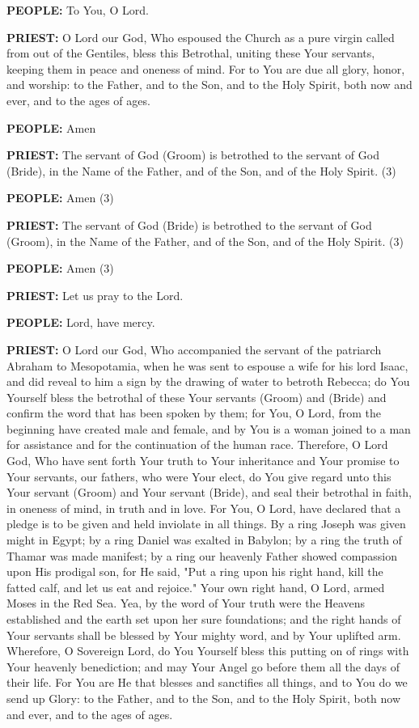\textbf{PEOPLE:} To You, O Lord.

\textbf{PRIEST:} O Lord our God, Who espoused the Church as a pure
virgin called from out of the Gentiles, bless this Betrothal, uniting
these Your servants, keeping them in peace and oneness of mind. For to
You are due all glory, honor, and worship: to the Father, and to the
Son, and to the Holy Spirit, both now and ever, and to the ages of ages.

\textbf{PEOPLE:} Amen

\textbf{PRIEST:} The servant of God (Groom) is betrothed to the servant
of God (Bride), in the Name of the Father, and of the Son, and of the
Holy Spirit. (3)

\textbf{PEOPLE:} Amen (3)

\textbf{PRIEST:} The servant of God (Bride) is betrothed to the servant
of God (Groom), in the Name of the Father, and of the Son, and of the
Holy Spirit. (3)

\textbf{PEOPLE:} Amen (3)

\textbf{PRIEST:} Let us pray to the Lord.

\textbf{PEOPLE:} Lord, have mercy.

\textbf{PRIEST:} O Lord our God, Who accompanied the servant of the
patriarch Abraham to Mesopotamia, when he was sent to espouse a wife for
his lord Isaac, and did reveal to him a sign by the drawing of water to
betroth Rebecca; do You Yourself bless the betrothal of these Your
servants (Groom) and (Bride) and confirm the word that has been spoken
by them; for You, O Lord, from the beginning have created male and
female, and by You is a woman joined to a man for assistance and for the
continuation of the human race. Therefore, O Lord God, Who have sent
forth Your truth to Your inheritance and Your promise to Your servants,
our fathers, who were Your elect, do You give regard unto this Your
servant (Groom) and Your servant (Bride), and seal their betrothal in
faith, in oneness of mind, in truth and in love. For You, O Lord, have
declared that a pledge is to be given and held inviolate in all things.
By a ring Joseph was given might in Egypt; by a ring Daniel was exalted
in Babylon; by a ring the truth of Thamar was made manifest; by a ring
our heavenly Father showed compassion upon His prodigal son, for He
said, "Put a ring upon his right hand, kill the fatted calf, and let us
eat and rejoice." Your own right hand, O Lord, armed Moses in the Red
Sea. Yea, by the word of Your truth were the Heavens established and the
earth set upon her sure foundations; and the right hands of Your
servants shall be blessed by Your mighty word, and by Your uplifted arm.
Wherefore, O Sovereign Lord, do You Yourself bless this putting on of
rings with Your heavenly benediction; and may Your Angel go before them
all the days of their life. For You are He that blesses and sanctifies
all things, and to You do we send up Glory: to the Father, and to the
Son, and to the Holy Spirit, both now and ever, and to the ages of ages.

